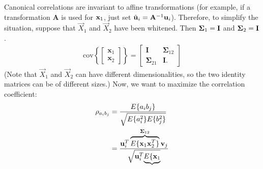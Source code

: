 \begin{enumerate}
\begin{solution}


    
    Canonical correlations are invariant to affine transformations
    (for example, if a transformation $\mathbf{A}$ is used for $\mathbf{x}_1$,
    just set $\hat {\mathbf{u}}_i=\mathbf{A}^{-1}\mathbf{u}_i$).  Therefore, to simplify
    the situation, suppose that $\vec{X}_1$ and $\vec{X}_2$ have been
    whitened.
    Then $\boldsymbol{\Sigma}_1=\mathbf{I}$ and $\boldsymbol{\Sigma}_2=\mathbf{I}$.
    \begin{align*}
      \mathrm{cov}\left\{
        \begin{bmatrix}
          \mathbf{x}_1
          \\
          \mathbf{x}_2
        \end{bmatrix}
      \right\}
      =
      \begin{bmatrix}
        \mathbf{I} & \mathbf{\Sigma}_{12}
        \\
        \mathbf{\Sigma}_{21} & \mathbf{I}.
      \end{bmatrix}
    \end{align*}
    (Note that $\vec{X}_1$ and $\vec{X}_2$ can have different
    dimensionalities, so the two identity matrices can be of different
    sizes.)
    Now, we want to maximize the correlation coefficient:
    \begin{align*}
      \rho_{a_i b_j} &= \frac{E\{a_i b_j\}} { \sqrt{ E\{a_i^2\}
          E\{b_j^2\} } }
      \\
      &= \frac{ \mathbf{u}_i^T \overbrace{E\{\mathbf{x}_1
          \mathbf{x}_2^T \}}^{\mathbf{\Sigma}_{12}} \mathbf{v}_j } {
        \sqrt{ \strut \mathbf{u}_i^T
          \smash{\underbrace{E\{\mathbf{x}_1
}}}}
\end{align*}
\end{solution}
\end{enumerate}
